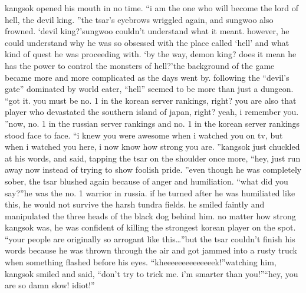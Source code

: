 kangsok opened his mouth in no time.
“i am the one who will become the lord of hell, the devil king.
”the tsar’s eyebrows wriggled again, and sungwoo also frowned.
‘devil king?’sungwoo couldn’t understand what it meant.
however, he could understand why he was so obsessed with the place called ‘hell’ and what kind of quest he was proceeding with.
‘by the way, demon king? does it mean he has the power to control the monsters of hell?’the background of the game became more and more complicated as the days went by.
 following the “devil’s gate” dominated by world eater, “hell” seemed to be more than just a dungeon.
“got it.
 you must be no.
 1 in the korean server rankings, right? you are also that player who devastated the southern island of japan, right? yeah, i remember you.
”now, no.
 1 in the russian server rankings and no.
 1 in the korean server rankings stood face to face.
“i knew you were awesome when i watched you on tv, but when i watched you here, i now know how strong you are.
”kangsok just chuckled at his words, and said, tapping the tsar on the shoulder once more, “hey, just run away now instead of trying to show foolish pride.
”even though he was completely sober, the tsar blushed again because of anger and humiliation.
“what did you say?”he was the no.
 1 warrior in russia.
 if he turned after he was humiliated like this, he would not survive the harsh tundra fields.
he smiled faintly and manipulated the three heads of the black dog behind him.
 no matter how strong kangsok was, he was confident of killing the strongest korean player on the spot.
“your people are originally so arrogant like this…”but the tsar couldn’t finish his words because he was thrown through the air and got jammed into a rusty truck when something flashed before his eyes.
“kheeeeeeeeeeeeeek!”watching him, kangsok smiled and said, “don’t try to trick me.
 i’m smarter than you!”“hey, you are so damn slow! idiot!”

 